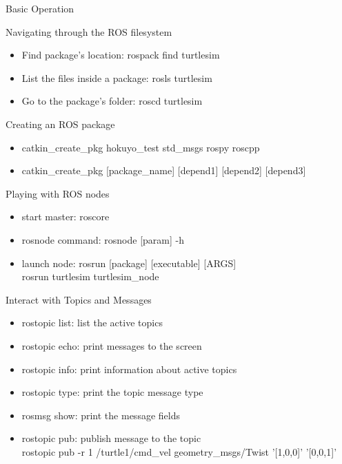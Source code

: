 \documentclass[10pt]{beamer}
\begin{document}
 \begin{frame}[allowframebreaks]{Basic Operation}
  \begin{block}{Navigating through the ROS filesystem}
   \begin{itemize}
    \item Find package's location: rospack find turtlesim
    \item List the files inside a package: rosls turtlesim
    \item Go to the package's folder: roscd turtlesim
   \end{itemize}
  \end{block}
  \begin{block}{Creating an ROS package}
   \begin{itemize}
    \item catkin\_create\_pkg hokuyo\_test std\_msgs rospy roscpp
    \item catkin\_create\_pkg [package\_name] [depend1] [depend2] [depend3]
   \end{itemize}
  \end{block}
  \begin{block}{Playing with ROS nodes}
   \begin{itemize}
    \item start master: roscore
    \item rosnode command: rosnode [param] -h
    \item launch node: rosrun [package] [executable] [ARGS] \\ rosrun turtlesim turtlesim\_node
   \end{itemize}   
  \end{block}
  \begin{block}{Interact with Topics and Messages}
   \begin{itemize}
    \item rostopic list: list the active topics
    \item rostopic echo: print messages to the screen
    \item rostopic info: print information about active topics
    \item rostopic type: print the topic message type
    \item rosmsg show: print the message fields
    \item rostopic pub: publish message to the topic \\
    rostopic pub -r 1 /turtle1/cmd\_vel geometry\_msgs/Twist '[1,0,0]' '[0,0,1]'
   \end{itemize}
  \end{block}

\end{frame}
\end{document}
